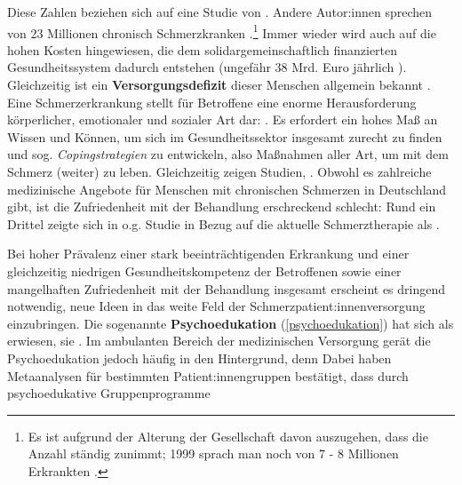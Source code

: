 \documentclass[
  twoside,
  parskip=half-,
  paper=176mm:246mm,
  BCOR=14mm,
  DIV=14,
]{scrreprt}
\begin{document}
  Diese Zahlen beziehen sich auf eine Studie von \textcite{HeftSchmerz28}.
    Andere Autor:innen sprechen von 23 Millionen chronisch Schmerzkranken \autocite[vgl.][4]{wachter}.\footnote{Es ist aufgrund der Alterung der Gesellschaft davon auszugehen, dass die Anzahl ständig zunimmt; 1999 sprach man noch von 7 - 8 Millionen Erkrankten \autocite[vgl.][17]{glier}.}
    Immer wieder wird auch auf die hohen Kosten hingewiesen, die dem solidargemeinschaftlich finanzierten Gesundheitssystem dadurch entstehen (ungefähr 38 Mrd. Euro jährlich \autocite[vgl.][]{Schmerzgesellschaft}).
    Gleichzeitig ist ein \textbf{Versorgungsdefizit} dieser Menschen allgemein bekannt \autocite[vgl.][]{Nachbessern}.
    Eine Schmerzerkrankung stellt für Betroffene eine enorme Herausforderung körperlicher, emotionaler und sozialer Art dar: . Es erfordert ein hohes Maß an Wissen und Können, um sich im Gesundheitssektor insgesamt zurecht zu finden und sog. \textit{Copingstrategien} zu entwickeln, also Maßnahmen aller Art, um mit dem Schmerz (weiter) zu leben.
    Gleichzeitig zeigen Studien, .
    Obwohl es zahlreiche medizinische Angebote für Menschen mit chronischen Schmerzen in Deutschland gibt, ist die Zufriedenheit mit der Behandlung erschreckend schlecht:
    Rund ein Drittel zeigte sich in o.g. Studie in Bezug auf die aktuelle Schmerztherapie als  \autocite[vgl.][]{HeftSchmerz28}.

    Bei hoher Prävalenz einer stark beeinträchtigenden Erkrankung und einer gleichzeitig niedrigen Gesundheitskompetenz der Betroffenen sowie einer mangelhaften Zufriedenheit mit der Behandlung insgesamt erscheint es dringend notwendig, neue Ideen in das weite Feld der Schmerzpatient:innenversorgung einzubringen. Die sogenannte \textbf{Psychoedukation} (\autoref{psychoedukation}) hat sich als  erwiesen, sie . Im ambulanten Bereich der medizinischen Versorgung gerät die Psychoedukation jedoch häufig in den Hintergrund, denn   Dabei haben Metaanalysen für bestimmten Patient:innengruppen bestätigt, dass durch psychoedukative Gruppenprogramme  
\end{document}
